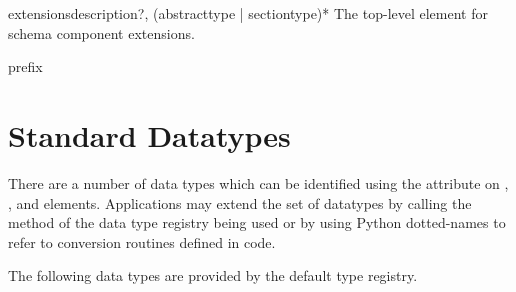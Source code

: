 \documentclass{howto}
\newcommand{\datatype}[1]{\strong{#1}}
\begin{document}
\begin{elementdesc}{extensions}{description?, (abstracttype | sectiontype)*}
  The top-level element for schema component extensions.

  \begin{attributedesc}{prefix}{\datatype{dotted-name}}
  \end{attributedesc}
\end{elementdesc}


\section{Standard  Datatypes\label{standard-datatypes}}

There are a number of data types which can be identified using the
 attribute on ,
, and  elements.
Applications may extend the set of datatypes by calling the
 method of the data type registry being used or by
using Python dotted-names to refer to conversion routines defined in
code.

The following data types are provided by the default type registry.
\end{document}
